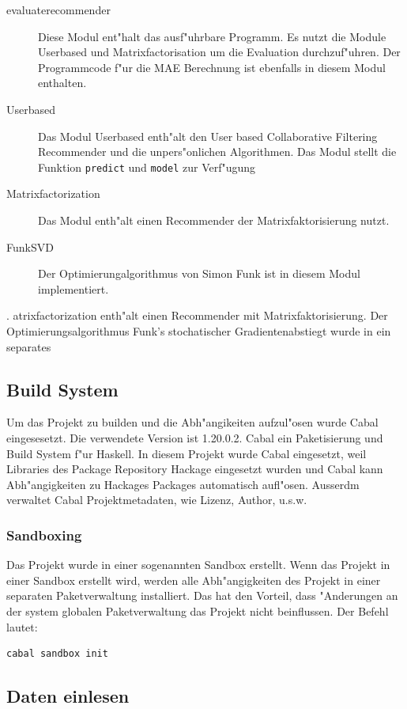 \documentclass[a4paper, 12pt]{article}
\begin{document}
\begin{description}
\item[evaluaterecommender] Diese Modul ent"halt das ausf"uhrbare Programm. Es nutzt die Module Userbased und Matrixfactorisation um die Evaluation durchzuf"uhren. Der Programmcode f"ur die MAE Berechnung ist ebenfalls in diesem Modul enthalten.
\item[Userbased] Das Modul Userbased enth"alt den User based Collaborative Filtering Recommender und die unpers"onlichen Algorithmen. Das Modul stellt die Funktion \verb|predict| und \verb|model| zur Verf"ugung
\item[Matrixfactorization] Das Modul enth"alt einen Recommender der Matrixfaktorisierung nutzt.
\item[FunkSVD] Der Optimierungalgorithmus von Simon Funk ist in diesem Modul implementiert.
\end{description}
.
atrixfactorization enth"alt einen Recommender mit Matrixfaktorisierung. Der Optimierungsalgorithmus Funk's stochatischer Gradientenabstiegt wurde in ein separates 

\subsection{Build System}
\label{sec:cabal}

Um das Projekt zu builden und die Abh"angikeiten aufzul"osen wurde Cabal eingesesetzt. Die verwendete Version ist 1.20.0.2. Cabal ein Paketisierung und Build System f"ur Haskell. In diesem Projekt wurde Cabal eingesetzt, weil Libraries des Package Repository Hackage eingesetzt wurden und Cabal kann Abh"angigkeiten zu Hackages Packages automatisch aufl"osen. Ausserdm verwaltet Cabal Projektmetadaten, wie Lizenz, Author, u.s.w.

\subsubsection{Sandboxing}
\label{sec:sanboxing}

Das Projekt wurde in einer sogenannten Sandbox erstellt. Wenn das Projekt in einer Sandbox erstellt wird, werden alle Abh"angigkeiten des Projekt in einer separaten Paketverwaltung installiert. Das hat den Vorteil, dass "Anderungen an der system globalen Paketverwaltung das Projekt nicht beinflussen. Der Befehl lautet:
\begin{verbatim}
cabal sandbox init
\end{verbatim}

\subsection{Daten einlesen}
\label{sec:readio}
\end{document}
